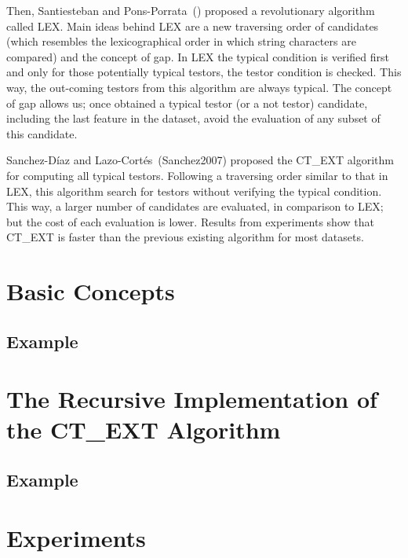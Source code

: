 \documentclass[citeauthoryear]{llncs}
\begin{document}
	Then, Santiesteban and Pons-Porrata~(\cite{Santiesteban2003}) proposed a revolutionary algorithm
	called LEX. Main ideas behind LEX are a new traversing order of candidates (which resembles the
	lexicographical order in which string characters are compared) and the concept of gap. In LEX
	the typical condition is verified first and only for those potentially typical testors, the testor 
	condition is checked. This way, the out-coming testors from this algorithm are always typical.
	The concept of gap allows us; once obtained a typical testor (or a not testor) candidate, including 
	the last feature in the dataset, avoid the evaluation of any subset of this candidate.
	
	Sanchez-D\'iaz and Lazo-Cort\'es~(Sanchez2007) proposed the CT\_EXT algorithm for computing all
	typical testors. Following a traversing order similar to that in LEX, this algorithm search for
	testors without verifying the typical condition. This way, a larger number of candidates are 
	evaluated, in comparison to LEX; but the cost of each evaluation is lower. Results from experiments
	show that CT\_EXT is faster than the previous existing algorithm for most datasets.
	
%
\section{Basic Concepts}
%
\subsection{Example}
%
\section{The Recursive Implementation of the CT\_EXT Algorithm}
%
\subsection{Example}
%
\section{Experiments}
%
%
\end{document}
